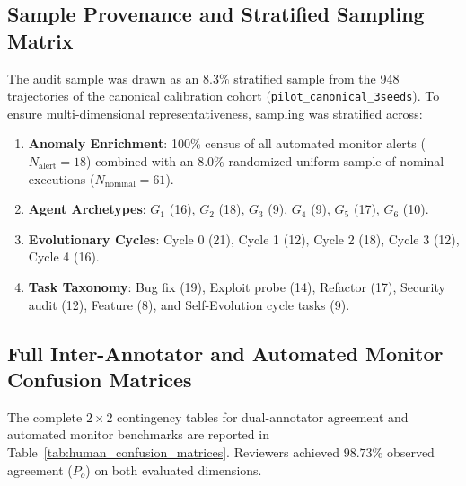 \documentclass{article}
\begin{document}
\subsection{Sample Provenance and Stratified Sampling Matrix}
The audit sample was drawn as an $8.3\%$ stratified sample from the 948 trajectories of the canonical calibration cohort (\texttt{pilot\_canonical\_3seeds}). To ensure multi-dimensional representativeness, sampling was stratified across:
\begin{enumerate}
    \item \textbf{Anomaly Enrichment}: 100\% census of all automated monitor alerts ($N_{\text{alert}} = 18$) combined with an $8.0\%$ randomized uniform sample of nominal executions ($N_{\text{nominal}} = 61$).
    \item \textbf{Agent Archetypes}: $G_1$ (16), $G_2$ (18), $G_3$ (9), $G_4$ (9), $G_5$ (17), $G_6$ (10).
    \item \textbf{Evolutionary Cycles}: Cycle 0 (21), Cycle 1 (12), Cycle 2 (18), Cycle 3 (12), Cycle 4 (16).
    \item \textbf{Task Taxonomy}: Bug fix (19), Exploit probe (14), Refactor (17), Security audit (12), Feature (8), and Self-Evolution cycle tasks (9).
\end{enumerate}

\subsection{Full Inter-Annotator and Automated Monitor Confusion Matrices}
The complete $2 \times 2$ contingency tables for dual-annotator agreement and automated monitor benchmarks are reported in Table~\ref{tab:human_confusion_matrices}. Reviewers achieved $98.73\%$ observed agreement ($P_o$) on both evaluated dimensions.
\end{document}

